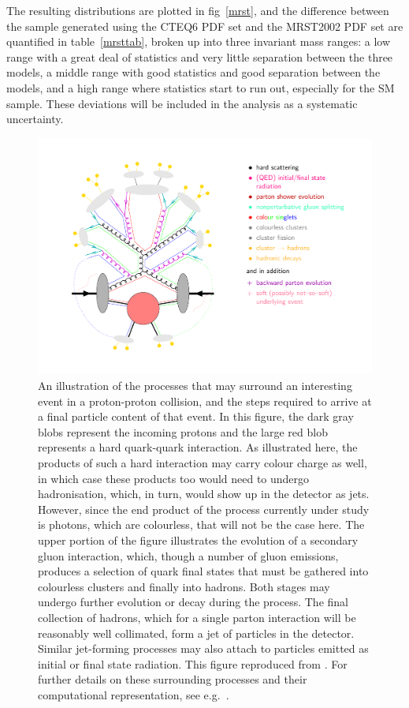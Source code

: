 The resulting distributions are plotted in fig~\ref{mrst}, and the difference between the sample generated using the CTEQ6 PDF set and the MRST2002 PDF set are quantified in table~\ref{mrsttab}, broken up into three invariant mass ranges: a low range with a great deal of statistics and very little separation between the three models, a middle range with good statistics and good separation between the models, and a high range where statistics start to run out, especially for the SM sample. These deviations will be included in the analysis as a systematic uncertainty.

\begin{figure}[htb]
\includegraphics[width=\textwidth]{figures/Zep-soft}
\caption{An illustration of the processes that may surround an interesting event in a proton-proton collision, and the steps required to arrive at a final particle content of that event. In this figure, the dark gray blobs represent the incoming protons and the large red blob represents a hard quark-quark interaction. As illustrated here, the products of such a hard interaction may carry colour charge as well, in which case these products too would need to undergo hadronisation, which, in turn, would show up in the detector as jets. However, since the end product of the process currently under study is photons, which are colourless, that will not be the case here. The upper portion of the figure illustrates the evolution of a secondary gluon interaction, which, though a number of gluon emissions, produces a selection of quark final states that must be gathered into colourless clusters and finally into hadrons. Both stages may undergo further evolution or decay during the process. The final collection of hadrons, which for a single parton interaction will be reasonably well collimated, form a jet of particles in the detector. Similar jet-forming processes may also attach to particles emitted as initial or final state radiation. This figure reproduced from \cite{zep}. For further details on these surrounding processes and their computational representation, see e.g.~\cite{pythman}.
\label{zep}}
\end{figure}

